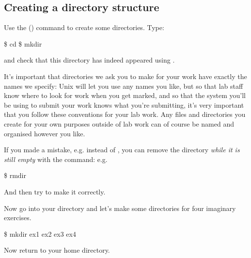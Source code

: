\subsection{Creating a directory structure}

Use the  () command
to create some directories. Type:

\begin{ttoutenv}
\$  cd
\$  mkdir \crsname\return
\end{ttoutenv}
%
and check that this directory has indeed appeared using .

It's important that directories we ask you to make for your work have
exactly the names we specify: Unix will let you use any names you
like, but so that lab staff know where to look for work when you get marked, and so that the system you'll be using to submit your work knows what you're submitting, it's very important that you follow these conventions for your lab work. Any files and directories you create for your own purposes outside of lab work can of course be named and organised however you like.

If you made a mistake, e.g. \fname{\crsnamelc} instead of \fname{\crsname},
you can remove the directory \textit{while it is still empty} with the
 command: e.g.
%
\begin{ttoutenv}
\$  rmdir \crsnamelc\return
\end{ttoutenv}
%
And then try to make it correctly.


Now go into your  directory and let's make some  directories for four imaginary \crsname{} exercises.

\begin{ttoutenv}
\$  mkdir ex1 ex2 ex3 ex4\return
\end{ttoutenv}
%
%
%
Now return to your home directory.

